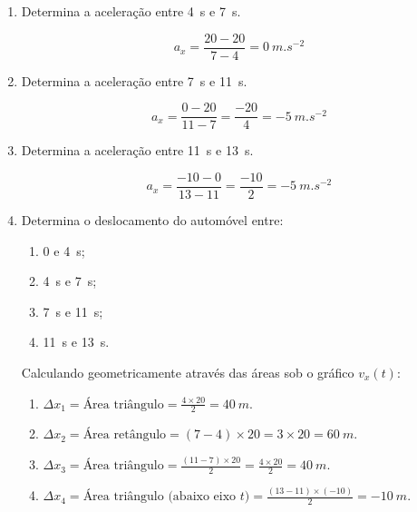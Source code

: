 \documentclass[11pt,a4paper]{article}
\begin{document}
\begin{enumerate}[label=\textbf{\arabic*.},resume]
		\item Determina a aceleração entre \SI{4}{s} e \SI{7}{s}.
		
		\begin{solucao}
			\[
			a_x = \frac{20 - 20}{7 - 4} = \SI{0}{m.s^{-2}}
			\]
		\end{solucao}
		
		\item Determina a aceleração entre \SI{7}{s} e \SI{11}{s}.
		
		\begin{solucao}
			\[
			a_x = \frac{0 - 20}{11 - 7} = \frac{-20}{4} = \SI{-5}{m.s^{-2}}
			\]
		\end{solucao}
		
		\item Determina a aceleração entre \SI{11}{s} e \SI{13}{s}.
		
		\begin{solucao}
			\[
			a_x = \frac{-10 - 0}{13 - 11} = \frac{-10}{2} = \SI{-5}{m.s^{-2}}
			\]
		\end{solucao}
		
		\item Determina o deslocamento do automóvel entre:
		
		\begin{enumerate}[label=\alph*)]
			
			\item $0$ e \SI{4}{s};
			
			\item \SI{4}{s} e \SI{7}{s};
			
			\item \SI{7}{s} e \SI{11}{s};
			
			\item \SI{11}{s} e \SI{13}{s}.
			
		\end{enumerate}
		
		\begin{solucao}
			Calculando geometricamente através das áreas sob o gráfico $v_x(t)$:
			\begin{enumerate}[label=\alph*)]
				\item $\Delta x_1 = \text{Área triângulo} = \frac{4 \times 20}{2} = \SI{40}{m}$.
				\item $\Delta x_2 = \text{Área retângulo} = (7 - 4) \times 20 = 3 \times 20 = \SI{60}{m}$.
				\item $\Delta x_3 = \text{Área triângulo} = \frac{(11 - 7) \times 20}{2} = \frac{4 \times 20}{2} = \SI{40}{m}$.
				\item $\Delta x_4 = \text{Área triângulo (abaixo eixo } t) = \frac{(13 - 11) \times (-10)}{2} = \SI{-10}{m}$.
			\end{enumerate}
		\end{solucao}
		

\end{enumerate}
\end{document}
